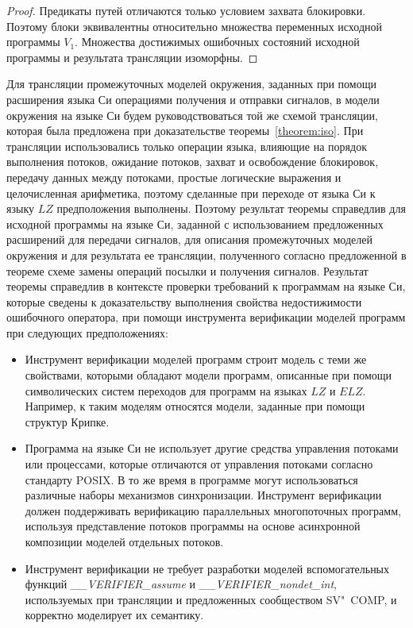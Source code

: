 \begin{proof}
Предикаты путей отличаются только условием захвата блокировки.
Поэтому блоки эквивалентны относительно множества переменных исходной программы $V_1$.
Множества достижимых ошибочных состояний исходной программы и результата трансляции изоморфны.
\end{proof}

Для трансляции промежуточных моделей окружения, заданных при помощи расширения языка Си операциями получения и отправки сигналов, в модели окружения на языке Си будем руководствоваться той же схемой трансляции, которая была предложена при доказательстве теоремы~\ref{theorem:iso}.
При трансляции использовались только операции языка, влияющие на порядок выполнения потоков, ожидание потоков, захват и освобождение блокировок, передачу данных между потоками, простые логические выражения и целочисленная арифметика, поэтому сделанные при переходе от языка Си к языку $LZ$ предположения выполнены.
Поэтому результат теоремы справедлив для исходной программы на языке Си, заданной с использованием предложенных расширений для передачи сигналов, для описания промежуточных моделей окружения и для результата ее трансляции, полученного согласно предложенной в теореме схеме замены операций посылки и получения сигналов.
Результат теоремы справедлив в контексте проверки требований к программам на языке Си, которые сведены к доказательству выполнения свойства недостижимости ошибочного оператора, при помощи инструмента верификации моделей программ при следующих предположениях:
\begin{itemize}
    \item Инструмент верификации моделей программ строит модель с теми же свойствами, которыми обладают модели программ, описанные при помощи символических систем переходов для программ на языках $LZ$ и $ELZ$.
    Например, к таким моделям относятся модели, заданные при помощи структур Крипке.
    \item Программа на языке Си не использует другие средства управления потоками или процессами, которые отличаются от управления потоками согласно стандарту POSIX. 
    В то же время в программе могут использоваться различные наборы механизмов синхронизации.
    Инструмент верификации должен поддерживать верификацию параллельных многопоточных программ, используя представление потоков программы на основе асинхронной композиции моделей отдельных потоков.
    \item Инструмент верификации не требует разработки моделей вспомогательных функций \textit{\_\_VERIFIER\_assume} и \textit{\_\_VERIFIER\_nondet\_int}, используемых при трансляции и предложенных сообществом SV"~COMP, и корректно моделирует их семантику.
\end{itemize}
